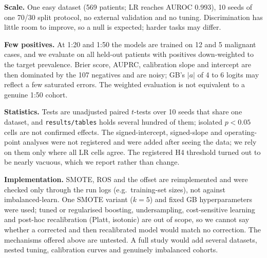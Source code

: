 \textbf{Scale.} One easy dataset (569 patients; LR reaches AUROC 0.993), 10 seeds of one 70/30 split protocol, no external validation and no tuning. Discrimination has little room to improve, so a null is expected; harder tasks may differ.

\textbf{Few positives.} At 1:20 and 1:50 the models are trained on 12 and 5 malignant cases, and we evaluate on all held-out patients with positives down-weighted to the target prevalence. Brier score, AUPRC, calibration slope and intercept are then dominated by the 107 negatives and are noisy; GB's $|a|$ of 4 to 6 logits may reflect a few saturated errors. The weighted evaluation is not equivalent to a genuine 1:50 cohort.

\textbf{Statistics.} Tests are unadjusted paired $t$-tests over 10 seeds that share one dataset, and \texttt{results/tables} holds several hundred of them; isolated $p<0.05$ cells are not confirmed effects. The signed-intercept, signed-slope and operating-point analyses were not registered and were added after seeing the data; we rely on them only where all LR cells agree. The registered H4 threshold turned out to be nearly vacuous, which we report rather than change.

\textbf{Implementation.} SMOTE, ROS and the offset are reimplemented and were checked only through the run logs (e.g.\ training-set sizes), not against imbalanced-learn. One SMOTE variant ($k=5$) and fixed GB hyperparameters were used; tuned or regularised boosting, undersampling, cost-sensitive learning and post-hoc recalibration (Platt, isotonic) are out of scope, so we cannot say whether a corrected and then recalibrated model would match no correction. The mechanisms offered above are untested. A full study would add several datasets, nested tuning, calibration curves and genuinely imbalanced cohorts.
